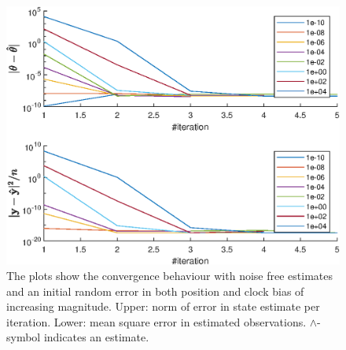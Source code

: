 \begin{figure}[htb]
    \centering %
  \includegraphics[width=0.8\linewidth]{Results/SimulationEstPos/mixedNoiseConv}
\caption{\label{fig:mixedConv} The plots show the convergence behaviour with noise free estimates and an initial random error in both position and clock bias of increasing magnitude. Upper: norm of error in state estimate per iteration. Lower: mean square error in estimated observations. $\wedge$-symbol indicates an estimate.}
\end{figure}	

